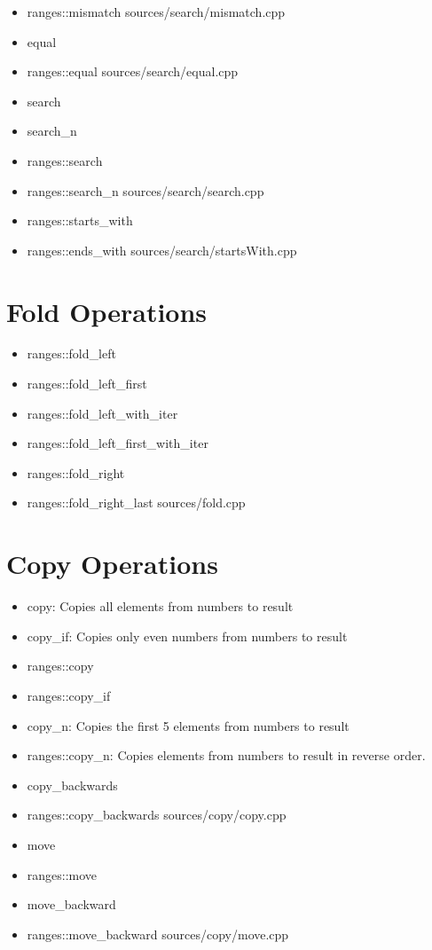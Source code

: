 \documentclass{article}
\begin{document}
\begin{itemize}
      \item ranges::mismatch
         {sources/search/mismatch.cpp}
      \item equal
      \item ranges::equal
         {sources/search/equal.cpp}
      \item search
      \item search\_n
      \item ranges::search
      \item ranges::search\_n
         {sources/search/search.cpp}
      \item ranges::starts\_with
      \item ranges::ends\_with
         {sources/search/startsWith.cpp}
    \end{itemize}
\section{Fold Operations}
    \begin{itemize}
      \item ranges::fold\_left
      \item ranges::fold\_left\_first
      \item ranges::fold\_left\_with\_iter
      \item ranges::fold\_left\_first\_with\_iter
      \item ranges::fold\_right
      \item ranges::fold\_right\_last
         {sources/fold.cpp}
    \end{itemize}
\section{Copy Operations}
    \begin{itemize}
      \item copy: Copies all elements from numbers to result
      \item copy\_if: Copies only even numbers from numbers to result
      \item ranges::copy
      \item ranges::copy\_if
      \item copy\_n: Copies the first 5 elements from numbers to result
      \item ranges::copy\_n: Copies elements from numbers to result in reverse order.
      \item copy\_backwards
      \item ranges::copy\_backwards
         {sources/copy/copy.cpp}
      \item move
      \item ranges::move
      \item move\_backward
      \item ranges::move\_backward
         {sources/copy/move.cpp}
    \end{itemize}
\end{document}
